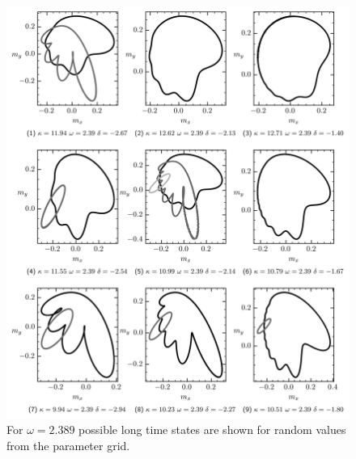     \begin{figure}[H]
        \centering
        \includegraphics{pictures/lc_traj_wcut3.png}
        \caption{For $\omega=2.389$ possible long time states are shown for random values from the parameter grid.}
    \end{figure}
    
